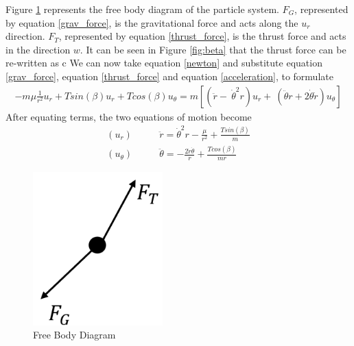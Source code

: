 \documentclass[]{article}
\begin{document}
Figure \ref{fig:FBD} represents the free body diagram of the particle system. \(F_{G}\), represented by equation \ref{grav_force}, is the gravitational force and acts along the \(u_{r}\) direction. \(F_{T}\), represented by equation \ref{thrust_force}, is the thrust force and acts in the direction \(w\). It can be seen in Figure \ref{fig:beta} that the thrust force can be re-written as 
c
We can now take equation \ref{newton} and substitute equation \ref{grav_force}, equation \ref{thrust_force} and equation \ref{acceleration}, to formulate
\begin{align*}
	 -m\mu\frac{1}{r^2}u_{r} + Tsin(\beta)u_{r} + Tcos(\beta)u_{\theta} = m[(\ddot{r} -\ \dot{\theta}^2r)u_{r} +\ (\ddot{\theta}r+2\dot{\theta}\dot{r})u_{\theta}] 
\end{align*}
After equating terms, the two equations of motion become
\begin{align}
	(u_{r})\qquad      &  \ddot{r}      = \dot{\theta}^2r - \frac{\mu}{r^2} + \frac{Tsin(\beta)}{m} \label{eom1}\\
	(u_{\theta})\qquad &  \ddot{\theta} = -\frac{2\dot{r}\dot{\theta}}{r}   + \frac{Tcos(\beta)}{mr} \label{eom2}
\end{align}
\begin{figure}
    \centering
	\includegraphics[width=50mm,scale=0.5]{FBD.png}
	\caption{Free Body Diagram}
	\label{fig:FBD}
\end{figure}
\end{document}
